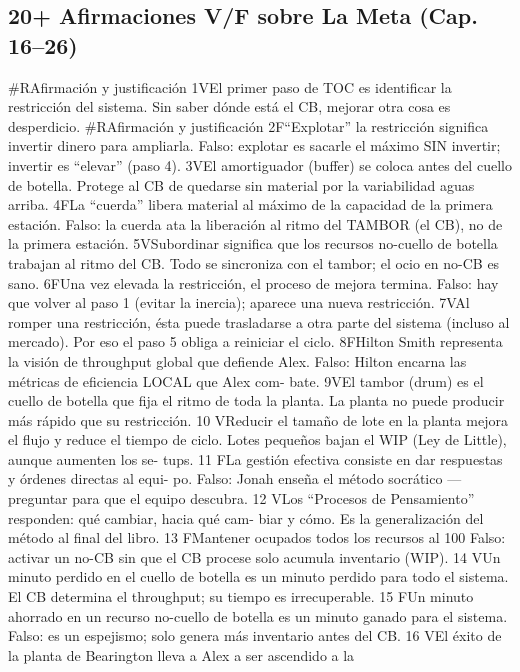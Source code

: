 \subsection{20+ Afirmaciones V/F sobre La Meta (Cap. 16–26)}
#RAfirmación y justificación
1VEl primer paso de TOC es identificar la restricción del sistema.
  Sin saber dónde está el CB, mejorar otra cosa es desperdicio.
#RAfirmación y justificación
2F“Explotar” la restricción significa invertir dinero para ampliarla.
  Falso: explotar es sacarle el máximo SIN invertir; invertir es “elevar”
  (paso 4).
3VEl amortiguador (buffer) se coloca antes del cuello de botella.
  Protege al CB de quedarse sin material por la variabilidad aguas arriba.
4FLa “cuerda” libera material al máximo de la capacidad de la primera
  estación.
  Falso: la cuerda ata la liberación al ritmo del TAMBOR (el CB), no de
  la primera estación.
5VSubordinar significa que los recursos no-cuello de botella trabajan al
  ritmo del CB.
  Todo se sincroniza con el tambor; el ocio en no-CB es sano.
6FUna vez elevada la restricción, el proceso de mejora termina.
  Falso: hay que volver al paso 1 (evitar la inercia); aparece una nueva
  restricción.
7VAl romper una restricción, ésta puede trasladarse a otra parte del sistema
  (incluso al mercado).
  Por eso el paso 5 obliga a reiniciar el ciclo.
8FHilton Smith representa la visión de throughput global que defiende Alex.
  Falso: Hilton encarna las métricas de eficiencia LOCAL que Alex com-
  bate.
9VEl tambor (drum) es el cuello de botella que fija el ritmo de toda la
  planta.
  La planta no puede producir más rápido que su restricción.
10   VReducir el tamaño de lote en la planta mejora el flujo y reduce el tiempo
  de ciclo.
  Lotes pequeños bajan el WIP (Ley de Little), aunque aumenten los se-
  tups.
11   FLa gestión efectiva consiste en dar respuestas y órdenes directas al equi-
  po.
  Falso: Jonah enseña el método socrático — preguntar para que el equipo
  descubra.
12   VLos “Procesos de Pensamiento” responden: qué cambiar, hacia qué cam-
  biar y cómo.
  Es la generalización del método al final del libro.
13   FMantener ocupados todos los recursos al 100 %
  Falso: activar un no-CB sin que el CB procese solo acumula inventario
  (WIP).
14   VUn minuto perdido en el cuello de botella es un minuto perdido para
  todo el sistema.
  El CB determina el throughput; su tiempo es irrecuperable.
15   FUn minuto ahorrado en un recurso no-cuello de botella es un minuto
  ganado para el sistema.
  Falso: es un espejismo; solo genera más inventario antes del CB.
16   VEl éxito de la planta de Bearington lleva a Alex a ser ascendido a la
